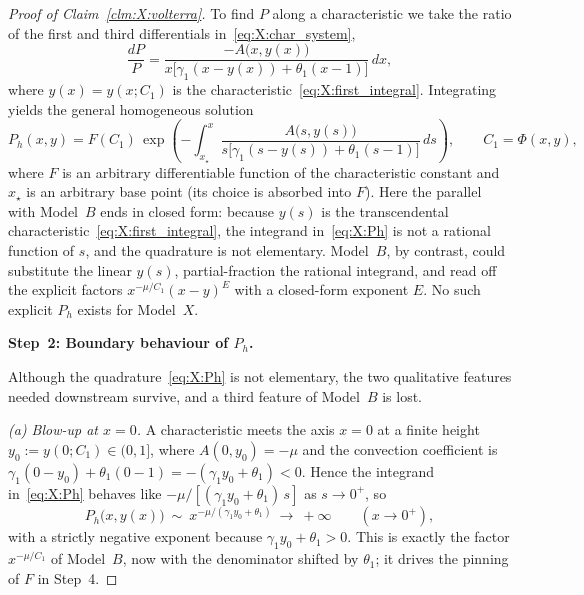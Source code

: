 \begin{proof}[Proof of Claim~\ref{clm:X:volterra}]
To find $P$ along a characteristic we take the ratio of the first and third differentials
in~\eqref{eq:X:char_system},
\begin{equation}
    \frac{dP}{P}
    = \frac{-A\bigl(x,y(x)\bigr)}
           {x\bigl[\gamma_1(x-y(x))+\theta_1(x-1)\bigr]}\,dx ,
    \label{eq:X:dPP}
\end{equation}
where $y(x)=y(x;C_1)$ is the characteristic~\eqref{eq:X:first_integral}. Integrating
yields the general homogeneous solution
\begin{equation}
    P_h(x,y)
    = F(C_1)\,\exp\!\left(
        -\int_{x_\star}^{x}
        \frac{A\bigl(s,y(s)\bigr)}
             {s\bigl[\gamma_1(s-y(s))+\theta_1(s-1)\bigr]}\,ds
    \right),
    \qquad C_1=\Phi(x,y),
    \label{eq:X:Ph}
\end{equation}
where $F$ is an arbitrary differentiable function of the characteristic constant and
$x_\star$ is an arbitrary base point (its choice is absorbed into $F$). Here the
parallel with Model~$B$ ends in closed form: because $y(s)$ is the transcendental
characteristic~\eqref{eq:X:first_integral}, the integrand in~\eqref{eq:X:Ph} is not a
rational function of $s$, and the quadrature is not elementary. Model~$B$, by contrast,
could substitute the linear $y(s)$, partial-fraction the rational integrand, and read
off the explicit factors $x^{-\mu/C_1}(x-y)^{E}$ with a closed-form exponent $E$. No such
explicit $P_h$ exists for Model~$X$.

\medskip\noindent\textbf{Step~2: Boundary behaviour of $P_h$.}

Although the quadrature~\eqref{eq:X:Ph} is not elementary, the two qualitative features
needed downstream survive, and a third feature of Model~$B$ is lost.

\smallskip\noindent\textit{(a) Blow-up at $x=0$.}
A characteristic meets the axis $x=0$ at a finite height $y_0:=y(0;C_1)\in(0,1]$, where
$A(0,y_0)=-\mu$ and the convection coefficient is
$\gamma_1(0-y_0)+\theta_1(0-1)=-(\gamma_1 y_0+\theta_1)<0$. Hence the integrand
in~\eqref{eq:X:Ph} behaves like $-\mu/[(\gamma_1 y_0+\theta_1)\,s]$ as $s\to0^+$, so
\begin{equation}
    P_h\bigl(x,y(x)\bigr)\ \sim\ x^{-\mu/(\gamma_1 y_0+\theta_1)}\ \longrightarrow\ +\infty
    \qquad (x\to0^+),
    \label{eq:X:Ph_at_zero}
\end{equation}
with a strictly negative exponent because $\gamma_1 y_0+\theta_1>0$. This is exactly the
factor $x^{-\mu/C_1}$ of Model~$B$, now with the denominator shifted by $\theta_1$; it
drives the pinning of $F$ in Step~4.


\end{proof}
